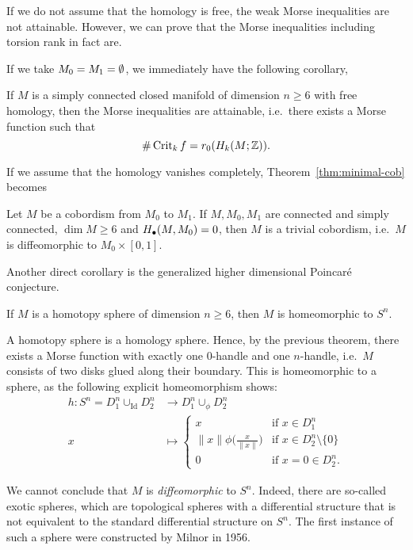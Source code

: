 \begin{remark}
    If we do not assume that the homology is free, the weak Morse inequalities are not attainable.
    However, we can prove that the Morse inequalities including torsion rank in fact are.
\end{remark}

If we take $ M_0 = M_1 = \emptyset$, we immediately have the following corollary,
\begin{corollary}
    If $M$ is a simply connected closed manifold of dimension  $n \ge 6$ with free homology, then the Morse inequalities are attainable, i.e.\ there exists a Morse function such that
    \[
        \# \operatorname{Crit}_kf = r_0 (H_k(M; \mathbb{Z}))
    .\] 
\end{corollary}

If we assume that the homology vanishes completely,
Theorem~\ref{thm:minimal-cob} becomes
\begin{corollary}
    Let $M$ be a cobordism from  $M_0$ to $M_1$.
    If $M, M_0, M_1$ are connected and simply connected, $\dim M \ge  6$ and $H_{\bullet}(M, M_0) = 0$, then $M$ is a trivial cobordism, i.e.\ $M$ is diffeomorphic to $M_0 \times [0,1]$.
\end{corollary}

Another direct corollary is the generalized higher dimensional Poincaré conjecture.

\begin{corollary}
    If $M$ is a homotopy sphere of dimension  $n \ge  6$, then $M$ is homeomorphic to  $S^{n}$.
\end{corollary}
\begin{myproof}
    A homotopy sphere is a homology sphere.
    Hence, by the previous theorem, there exists a Morse function with exactly one $0$-handle and one $n$-handle, i.e.\ $M$ consists of two disks glued along their boundary. This is homeomorphic to a sphere, as the following explicit homeomorphism shows:
    \begin{align*}
        h: S^{n} = D_1^{n} \cup_\text{Id}  D_2^{n} &\longrightarrow D_1^{n} \cup_\phi D_2^{n} \\
         x &\longmapsto 
         \begin{cases}
             x & \text{if $x \in D_1^{n}$}\\
             \|x\| \phi\Big(\frac{x}{\|x\|}\Big) & \text{if $x \in D_2 ^{n} \setminus \{0\} $}\\
             0 & \text{if $x = 0 \in D_2^{n}$.}
         \end{cases}
    \end{align*}
\end{myproof}
\begin{remark}
    We cannot conclude that $M$ is \emph{diffeomorphic} to $S^{n}$.
    Indeed, there are so-called exotic spheres, which are topological spheres with a differential structure that is not equivalent to the standard differential structure on $S^{n}$.
    The first instance of such a sphere were constructed by Milnor in 1956.
\end{remark}

